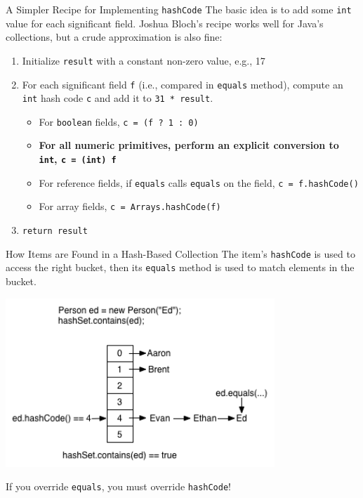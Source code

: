 \documentclass{beamer}
\begin{document}
\begin{frame}[fragile]{A Simpler Recipe for Implementing {\tt hashCode}}
\vspace{-.05in}
The basic idea is to add some {\tt int} value for each significant field.  Joshua Bloch's recipe works well for Java's collections, but a crude approximation is also fine:
\begin{enumerate}
\item Initialize {\tt result} with a constant non-zero value, e.g., 17
\item For each significant field {\tt f} (i.e., compared in {\tt equals} method), compute an {\tt int} hash code {\tt c} and add it to {\tt 31 * result}.
\begin{itemize}
\item For {\tt boolean} fields, {\tt c = (f ? 1 : 0)}
\item {\bf For all numeric primitives, perform an explicit conversion to {\tt int}, {\tt c = (int) f}}
\item For reference fields, if {\tt equals} calls {\tt equals} on the field, {\tt c = f.hashCode()}
\item For array fields, {\tt c = Arrays.hashCode(f)}
\end{itemize}
\item {\tt return result}
\end{enumerate}

\end{frame}

\begin{frame}[fragile]{How Items are Found in a Hash-Based Collection}
\vspace{-.1in}
The item's {\tt hashCode} is used to access the right bucket, then its {\tt equals} method is used to match elements in the bucket.
\vspace{-.1in}
\begin{center}
\includegraphics[height=2.5in]{hashtable-find.png}
\end{center}
\vspace{-.1in}
If you override {\tt equals}, you must override {\tt hashCode}!
\end{frame}
\end{document}
